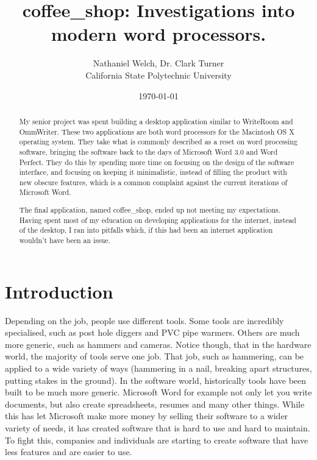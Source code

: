 \documentclass[11pt]{article}
\begin{document}
\title{\vfill coffee\_shop: Investigations into modern word processors.} %
\author{
Nathaniel Welch, Dr. Clark Turner\vspace{10pt} \\
California State Polytechnic University\vspace{10pt} \\
}
\date{\today}
\maketitle

\doublespacing

\vfill
\begin{abstract}
My senior project was spent building a desktop application similar to WriteRoom and OmmWriter. These two applications are both word processors for the Macintosh OS X operating system. They take what is commonly described as a reset on word processing software, bringing the software back to the days of Microsoft Word 3.0 and Word Perfect. They do this by spending more time on focusing on the design of the software interface, and focusing on keeping it minimalistic, instead of filling the product with new obscure features, which is a common complaint against the current iterations of Microsoft Word.

The final application, named coffee\_shop, ended up not meeting my expectations. Having spent most of my education on developing applications for the internet, instead of the desktop, I ran into pitfalls which, if this had been an internet application wouldn't have been an issue.
\end{abstract}

\thispagestyle{empty}
% 

\newpage

\section{Introduction}

Depending on the job, people use different tools. Some tools are incredibly specialised, such as post hole diggers and PVC pipe warmers. Others are much more generic, such as hammers and cameras. Notice though, that in the hardware world, the majority of tools serve one job. That job, such as hammering, can be applied to a wide variety of ways (hammering in a nail, breaking apart structures, putting stakes in the ground). In the software world, historically tools have been built to be much more generic. Microsoft Word for example not only let you write documents, but also create spreadsheets, resumes and many other things. While this has let Microsoft make more money by selling their software to a wider variety of needs, it has created software that is hard to use and hard to maintain. To fight this, companies and individuals are starting to create software that have less features and are easier to use.
\end{document}
